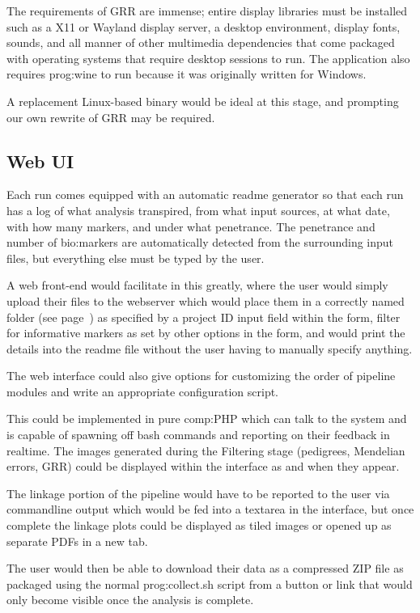 The requirements of GRR are immense; entire display libraries must be installed such as a X11 or Wayland display server, a desktop environment, display fonts, sounds, and all manner of other multimedia dependencies that come packaged with operating systems that require desktop sessions to run. The application also requires \gls{prog:wine} to run because it was originally written for Windows.

A replacement Linux-based binary would be ideal at this stage, and prompting our own rewrite of GRR may be required.


\subsection{Web UI}

Each run comes equipped with an automatic readme generator so that each run has a log of what analysis transpired, from what input sources, at what date, with how many markers, and under what penetrance. The penetrance and number of \gls{bio:markers} are automatically detected from the surrounding input files, but everything else must be typed by the user.

A web front-end would facilitate in this greatly, where the user would simply upload their files to the webserver which would place them in a correctly named folder (see page~\pageref{ref:meth:foldconv}) as specified by a project ID input field within the form, filter for informative markers as set by other options in the form, and would print the details into the readme file without the user having to manually specify anything.

The web interface could also give options for customizing the order of pipeline modules and write an appropriate configuration script.

This could be implemented in pure \gls{comp:PHP} \cite{bakken2000php} which can talk to the system and is capable of spawning off bash commands and reporting on their feedback in realtime. The images generated during the Filtering stage (pedigrees, Mendelian errors, GRR) could be displayed within the interface as and when they appear.

The linkage portion of the pipeline would have to be reported to the user via commandline output which would be fed into a textarea in the interface, but once complete the linkage plots could be displayed as tiled images or opened up as separate PDFs in a new tab.

The user would then be able to download their data as a compressed ZIP file as packaged using the normal \gls{prog:collect.sh} script from a button or link that would only become visible once the analysis is complete.

